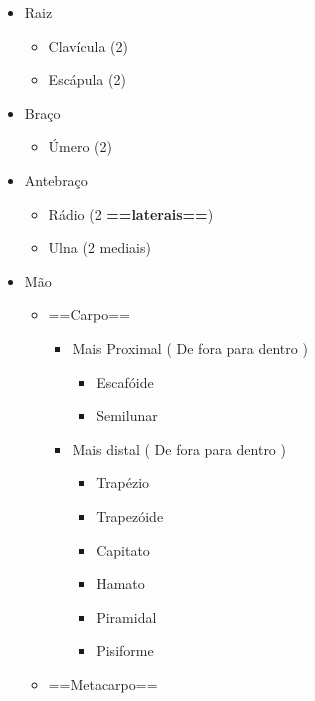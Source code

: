 \documentclass[
]{book}
\providecommand{\tightlist}{%
  \setlength{\itemsep}{0pt}\setlength{\parskip}{0pt}}
\begin{document}
\begin{itemize}
\tightlist
\item
  Raiz

  \begin{itemize}
  \tightlist
  \item
    Clavícula (2)
  \item
    Escápula (2)
  \end{itemize}
\item
  Braço

  \begin{itemize}
  \tightlist
  \item
    Úmero (2)
  \end{itemize}
\item
  Antebraço

  \begin{itemize}
  \tightlist
  \item
    Rádio (2 \textbf{==laterais==})
  \item
    Ulna (2 mediais)
  \end{itemize}
\item
  Mão

  \begin{itemize}
  \tightlist
  \item
    ==Carpo==

    \begin{itemize}
    \tightlist
    \item
      Mais Proximal ( De fora para dentro )

      \begin{itemize}
      \tightlist
      \item
        Escafóide
      \item
        Semilunar
      \end{itemize}
    \item
      Mais distal ( De fora para dentro )

      \begin{itemize}
      \tightlist
      \item
        Trapézio
      \item
        Trapezóide
      \item
        Capitato
      \item
        Hamato
      \item
        Piramidal
      \item
        Pisiforme
      \end{itemize}
    \end{itemize}
  \item
    ==Metacarpo==


\end{itemize}
\end{itemize}
\end{document}
